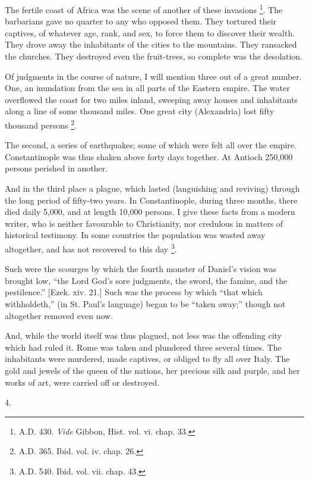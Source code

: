 The fertile coast of Africa was the scene of another of these
invasions \footnote{A.D. 430. \emph{Vide} Gibbon, Hist. vol. vi.
chap. 33.}. The barbarians
gave no quarter to any who opposed them. They tortured their captives,
of whatever age, rank, and sex, to force them to discover their
wealth. They drove away the inhabitants of the cities to the
mountains. They ransacked the churches. They destroyed even the
fruit-trees, so complete was the desolation.

Of judgments in the course of nature, I will mention three out of a
great number. One, an inundation from the sea in all parts of the
Eastern empire. The water overflowed the coast for two miles inland,
sweeping away houses and inhabitants along a line of some thousand
miles. One great city (Alexandria) lost fifty thousand persons \footnote{A.D. 365. Ibid. vol. iv. chap. 26.}.

The second, a series of earthquakes; some of which were felt all
over the empire. Constantinople was thus shaken above forty days
together. At Antioch 250,000 persons perished in another.

And in the third place a plague, which lasted (languishing and
reviving) through the long period of fifty-two years. In
Constantinople, during three months, there died daily 5,000, and at
length 10,000 persons. I give these facts from a modern writer, who is
neither favourable to Christianity, nor credulous in matters of
historical testimony. In some countries the population was wasted away
altogether, and has not recovered to this day \footnote{A.D. 540. Ibid. vol. vii. chap. 43.}.

Such were the scourges by which the fourth monster of Daniel's
vision was brought low, ``the Lord God's sore judgments, the
sword, the famine, and the pestilence.'' [Ezek. xiv. 21.] Such was
the process by which ``that which withholdeth,'' (in St. Paul's
language) began to be ``taken away;'' though not altogether
removed even now.

And, while the world itself was thus plagued, not less was the
offending city which had ruled it. Rome was taken and plundered three
several times. The inhabitants were murdered, made captives, or
obliged to fly all over Italy. The gold and jewels of the queen of the
nations, her precious silk and purple, and her works of art, were
carried off or destroyed.

4.

